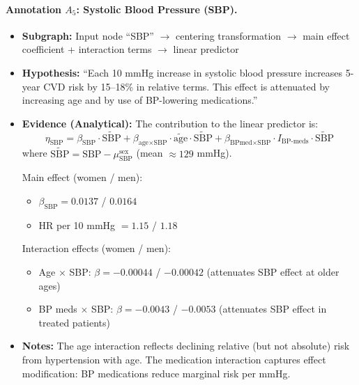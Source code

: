 \documentclass{article}
\begin{document}
\paragraph{Annotation $A_5$: Systolic Blood Pressure (SBP).}
\begin{itemize}
    \item \textbf{Subgraph:} Input node ``SBP'' $\rightarrow$ centering transformation $\rightarrow$ main effect coefficient + interaction terms $\rightarrow$ linear predictor
    \item \textbf{Hypothesis:} ``Each 10 mmHg increase in systolic blood pressure increases 5-year CVD risk by 15--18\% in relative terms. This effect is attenuated by increasing age and by use of BP-lowering medications.''
    \item \textbf{Evidence (Analytical):} The contribution to the linear predictor is:
    \[
    \eta_{\text{SBP}} = \beta_{\text{SBP}} \cdot \widetilde{\text{SBP}} + \beta_{\text{age} \times \text{SBP}} \cdot \tilde{\text{age}} \cdot \widetilde{\text{SBP}} + \beta_{\text{BPmed} \times \text{SBP}} \cdot I_{\text{BP-meds}} \cdot \widetilde{\text{SBP}}
    \]
    where $\widetilde{\text{SBP}} = \text{SBP} - \mu_{\text{SBP}}^{\text{sex}}$ (mean $\approx 129$ mmHg).
    
    Main effect (women / men):
    \begin{itemize}
        \item $\beta_{\text{SBP}} = 0.0137$ / $0.0164$
        \item HR per 10 mmHg $= 1.15$ / $1.18$
    \end{itemize}
    
    Interaction effects (women / men):
    \begin{itemize}
        \item Age $\times$ SBP: $\beta = -0.00044$ / $-0.00042$ (attenuates SBP effect at older ages)
        \item BP meds $\times$ SBP: $\beta = -0.0043$ / $-0.0053$ (attenuates SBP effect in treated patients)
    \end{itemize}
    \item \textbf{Notes:} The age interaction reflects declining relative (but not absolute) risk from hypertension with age. The medication interaction captures effect modification: BP medications reduce marginal risk per mmHg.
\end{itemize}
\end{document}
